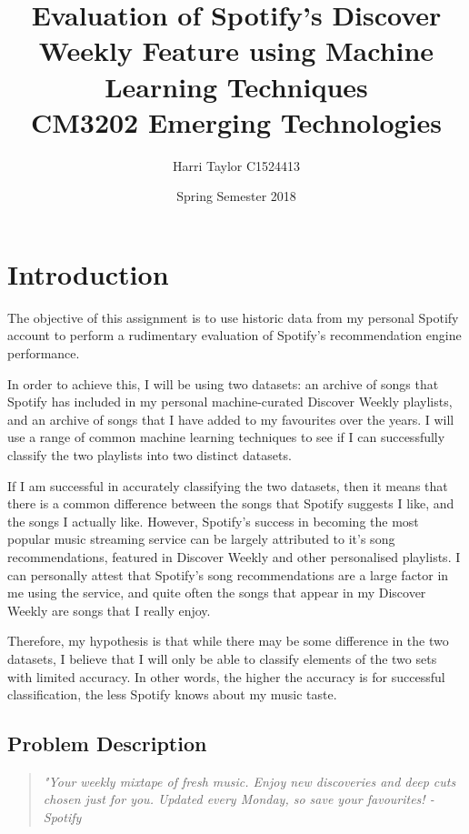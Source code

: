\documentclass{article}
\title{
	Evaluation of Spotify's Discover Weekly Feature using Machine Learning Techniques \\ 
	\large CM3202 Emerging Technologies
	}
\author{Harri Taylor C1524413}
\date{Spring Semester 2018}
\begin{document}
	\maketitle
	\newpage
	
	\section{Introduction}
	
	The objective of this assignment is to use historic data from my personal Spotify account to perform a rudimentary evaluation of Spotify's recommendation engine performance. 
	
	In order to achieve this, I will be using two datasets: an archive of songs that Spotify has included in my personal machine-curated Discover Weekly playlists, and an archive of songs that I have added to my favourites over the years. I will use a range of common machine learning techniques to see if I can successfully classify the two playlists into two distinct datasets. 
	
	If I am successful in accurately classifying the two datasets, then it means that there is a common difference between the songs that Spotify suggests I like, and the songs I actually like. However, Spotify's success in becoming the most popular music streaming service can be largely attributed to it's song recommendations, featured in Discover Weekly and other personalised playlists. I can personally attest that Spotify's song recommendations are a large factor in me using the service, and quite often the songs that appear in my Discover Weekly are songs that I really enjoy. 
	
	Therefore, my hypothesis is that while there may be some difference in the two datasets, I believe that I will only be able to classify elements of the two sets with limited accuracy. In other words, the higher the accuracy is for successful classification, the less Spotify knows about my music taste.
	
		\subsection{Problem Description}
		\begin{quotation}
		\textit{"Your weekly mixtape of fresh music. Enjoy new discoveries and deep cuts chosen just for you. Updated every Monday, so save your favourites! - \emph{Spotify}}
		\end{quotation}
		
\end{document}
